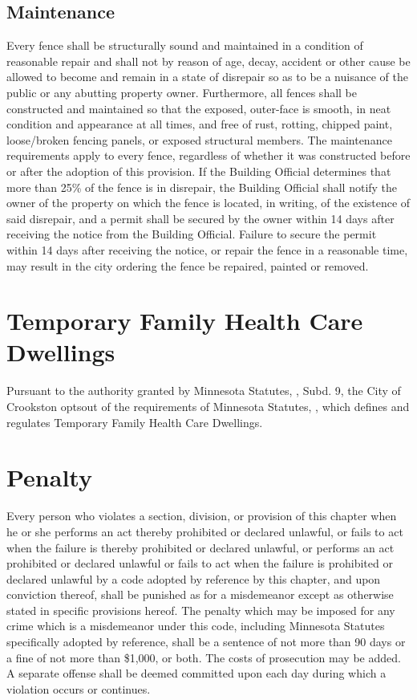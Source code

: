 \subsection{Maintenance}
Every fence shall be structurally sound and maintained in a condition of reasonable repair and shall not by reason of age, decay, accident or other cause be allowed to become and remain in a state of disrepair so as to be a nuisance of the public or any abutting property owner.  Furthermore, all fences shall be constructed and maintained so that the exposed, outer-face is smooth, in neat condition and appearance at all times, and free of rust, rotting, chipped paint, loose/broken fencing panels, or exposed structural members.  The maintenance requirements apply to every fence, regardless of whether it was constructed before or after the adoption of this provision.  If the Building Official determines that more than 25\% of the fence is in disrepair, the Building Official shall notify the owner of the property on which the fence is located, in writing, of the existence of said disrepair, and a permit shall be secured by the owner within 14 days after receiving the notice from the Building Official.  Failure to secure the permit within 14 days after receiving the notice, or repair the fence in a reasonable time, may result in the city ordering the fence be repaired, painted or removed.    

\section{Temporary Family Health Care Dwellings}
Pursuant to the authority granted by Minnesota Statutes, , Subd. 9, the City of Crookston optsout of the requirements of Minnesota Statutes, , which defines and regulates Temporary Family Health Care Dwellings.

\setcounter{section}{98}
\section{Penalty}
Every person who violates a section, division, or provision of this chapter when he or she performs an act thereby prohibited or declared unlawful, or fails to act when the failure is thereby prohibited or declared unlawful, or performs an act prohibited or declared unlawful or fails to act when the failure is prohibited or declared unlawful by a code adopted by reference by this chapter, and upon conviction thereof, shall be punished as for a misdemeanor except as otherwise stated in specific provisions hereof. The penalty which may be imposed for any crime which is a misdemeanor under this code, including Minnesota Statutes specifically adopted by reference, shall be a sentence of not more than 90 days or a fine of not more than \$1,000, or both. The costs of prosecution may be added. A separate offense shall be deemed committed upon each day during which a violation occurs or continues.
